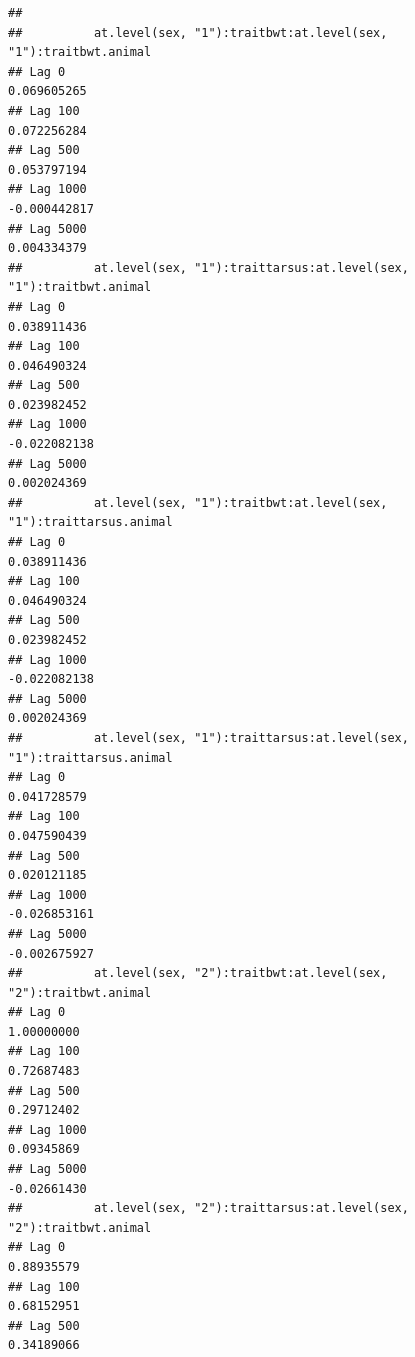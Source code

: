 \documentclass[
  12pt,
]{book}
\begin{document}
\begin{verbatim}
## 
##          at.level(sex, "1"):traitbwt:at.level(sex, "1"):traitbwt.animal
## Lag 0                                                       0.069605265
## Lag 100                                                     0.072256284
## Lag 500                                                     0.053797194
## Lag 1000                                                   -0.000442817
## Lag 5000                                                    0.004334379
##          at.level(sex, "1"):traittarsus:at.level(sex, "1"):traitbwt.animal
## Lag 0                                                          0.038911436
## Lag 100                                                        0.046490324
## Lag 500                                                        0.023982452
## Lag 1000                                                      -0.022082138
## Lag 5000                                                       0.002024369
##          at.level(sex, "1"):traitbwt:at.level(sex, "1"):traittarsus.animal
## Lag 0                                                          0.038911436
## Lag 100                                                        0.046490324
## Lag 500                                                        0.023982452
## Lag 1000                                                      -0.022082138
## Lag 5000                                                       0.002024369
##          at.level(sex, "1"):traittarsus:at.level(sex, "1"):traittarsus.animal
## Lag 0                                                             0.041728579
## Lag 100                                                           0.047590439
## Lag 500                                                           0.020121185
## Lag 1000                                                         -0.026853161
## Lag 5000                                                         -0.002675927
##          at.level(sex, "2"):traitbwt:at.level(sex, "2"):traitbwt.animal
## Lag 0                                                        1.00000000
## Lag 100                                                      0.72687483
## Lag 500                                                      0.29712402
## Lag 1000                                                     0.09345869
## Lag 5000                                                    -0.02661430
##          at.level(sex, "2"):traittarsus:at.level(sex, "2"):traitbwt.animal
## Lag 0                                                           0.88935579
## Lag 100                                                         0.68152951
## Lag 500                                                         0.34189066

\end{verbatim}
\end{document}
